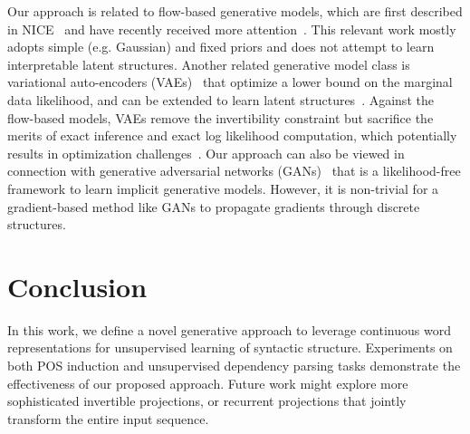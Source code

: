 \documentclass[11pt,a4paper]{article}
\begin{document}
Our approach is related to flow-based generative models, which are first described in NICE~\citep{dinh2014nice} and have recently received more attention~\citep{dinh2016density, jacobsen2018revnet, kingma2018glow}. This relevant work mostly adopts simple (e.g. Gaussian) and fixed priors and does not attempt to learn interpretable latent structures. Another related generative model class is variational auto-encoders (VAEs)~\citep{kingma2013auto} that optimize a lower bound on the marginal data likelihood, and can be extended to learn latent structures~\citep{miao2016language, yin2018structvae}. Against the flow-based models, VAEs remove the invertibility constraint but sacrifice the merits of exact inference and exact log likelihood computation, which potentially results in optimization challenges~\citep{kingma2016improved}. 
Our approach can also be viewed in connection with generative adversarial networks (GANs)~\citep{goodfellow2014generative} that is a likelihood-free framework to learn implicit generative models. However, it is non-trivial for a gradient-based method like GANs to propagate gradients through discrete structures.

\section{Conclusion}

In this work, we define a novel generative approach to leverage continuous word representations for unsupervised learning of syntactic structure. Experiments on both POS induction and unsupervised dependency parsing tasks demonstrate the effectiveness of our proposed approach. Future work might explore more sophisticated invertible projections, or recurrent projections that jointly transform the entire input sequence. 


\end{document}
